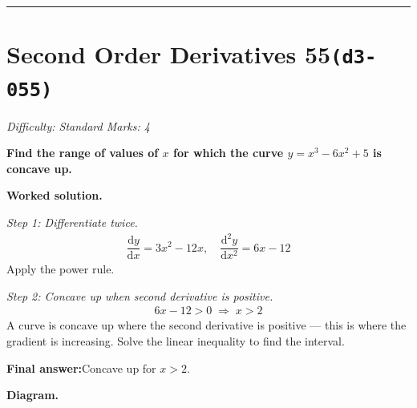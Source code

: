 \documentclass[11pt]{article}
\newcommand{\question}[1]{\par\medskip\noindent\textbf{#1}\par}
\begin{document}
\medskip\hrule

\section*{Second Order Derivatives 55\quad\small\texttt{(d3-055)}}
\textit{Difficulty: Standard \quad\textbar\quad Marks: 4}

\question{Find the range of values of \( x \) for which the curve \( y = x^3 - 6x^2 + 5 \) is concave up.}

\textbf{Worked solution.}

\textit{Step 1: Differentiate twice.}
\[\begin{gathered}
\dfrac{\mathrm{d}y}{\mathrm{d}x} = 3x^2 - 12x, \quad \dfrac{\mathrm{d}^2y}{\mathrm{d}x^2} = 6x - 12
\end{gathered}\]
Apply the power rule.

\textit{Step 2: Concave up when second derivative is positive.}
\[\begin{gathered}
6x - 12 > 0 \;\Rightarrow\; x > 2
\end{gathered}\]
A curve is concave up where the second derivative is positive --- this is where the gradient is increasing. Solve the linear inequality to find the interval.

\begin{answerbox}
\textbf{Final answer:}\quad Concave up for \(\displaystyle  x > 2 \).
\end{answerbox}
\textbf{Diagram.}
\end{document}
